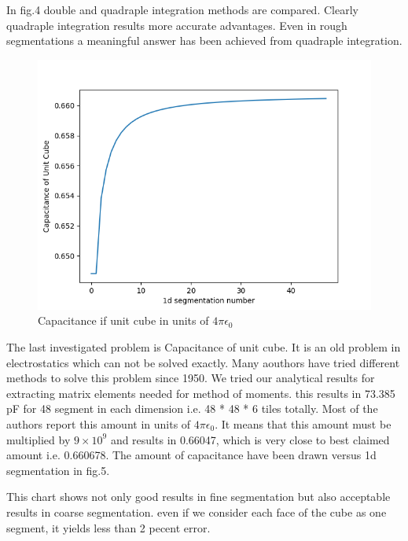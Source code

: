 \documentclass[twoside,twocolumn]{article}
\begin{document}
In fig.4 double and quadraple integration methods are compared. Clearly quadraple integration results more accurate advantages. Even in rough segmentations a meaningful answer has been achieved from quadraple integration.

\begin {figure}[h]
	\center
	\includegraphics[width=\linewidth]	{unitcube.png}
	\caption{Capacitance if unit cube in units of $4\pi \epsilon_0$}
\end{figure}
The last investigated problem is Capacitance of unit cube. It is an old problem in electrostatics which can not be solved exactly. Many aouthors have tried different methods to solve this problem since 1950. We tried our analytical results for extracting matrix elements needed for method of moments. this results in 73.385 pF for 48 segment in each dimension i.e. 48 * 48 * 6 tiles totally. Most of the authors report this amount in units of $4\pi \epsilon_0$. It means that this amount must be multiplied by $9 \times 10^9$ and results in 0.66047, which is very close to best claimed amount i.e. 0.660678. The amount of capacitance have been drawn versus 1d segmentation in fig.5.

This chart shows not only good results in fine segmentation but also acceptable results in coarse segmentation. even if we consider each face of the cube as one segment, it yields less than 2 pecent error.
\end{document}
